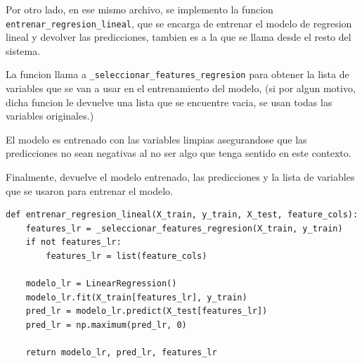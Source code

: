 Por otro lado, en ese mismo archivo, se implemento la funcion \texttt{entrenar\_regresion\_lineal}, que se encarga de entrenar el modelo de regresion lineal y devolver las predicciones, tambien es a la que se llama desde el resto del sistema.

La funcion llama a \texttt{\_seleccionar\_features\_regresion} para obtener la lista de variables que se van a usar en el entrenamiento del modelo, (si por algun motivo, dicha funcion le devuelve una lista que se encuentre vacia, se usan todas las variables originales.)

El modelo es entrenado con las variables limpias asegurandose que las predicciones no sean negativas al no ser algo que tenga sentido en este contexto. 

Finalmente, devuelve el modelo entrenado, las predicciones y la lista de variables que se usaron para entrenar el modelo.

\begin{verbatim}
def entrenar_regresion_lineal(X_train, y_train, X_test, feature_cols):
    features_lr = _seleccionar_features_regresion(X_train, y_train)
    if not features_lr:
        features_lr = list(feature_cols)

    modelo_lr = LinearRegression()
    modelo_lr.fit(X_train[features_lr], y_train)
    pred_lr = modelo_lr.predict(X_test[features_lr])
    pred_lr = np.maximum(pred_lr, 0)

    return modelo_lr, pred_lr, features_lr

\end{verbatim}
